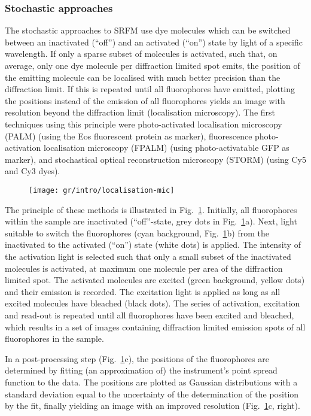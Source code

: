\subsubsection{Stochastic approaches}
\label{sec:smlm}
The stochastic approaches to SRFM use dye molecules which can be switched
between an inactivated (``off'') and an activated (``on'') state by light of a
specific wavelength. If only a sparse subset of molecules is activated, such
that, on average, only one dye molecule per diffraction limited spot emits,
the position of the emitting molecule can be localised with much better
precision than the diffraction limit. If this is repeated until all
fluorophores have emitted, plotting the positions instead of the emission of
all fluorophores yields an image with resolution beyond the diffraction
limit (localisation microscopy). The first techniques using this principle
were photo-activated localisation microscopy (PALM) \cite{Betzig2006} (using
the Eos fluorescent protein \cite{Wiedenmann2004} as marker), fluorescence
photo-activation localisation microscopy (FPALM) \cite{Hess2006} (using
photo-activatable GFP as marker), and stochastical
optical reconstruction microscopy (STORM) \cite{Rust2006} (using Cy5 and Cy3
dyes).

\begin{figure}
  \centering
  \texttt{[image: gr/intro/localisation-mic]}
  \caption{}
  \label{fig:lm}
\end{figure}

The principle of these methods is illustrated in Fig.~\ref{fig:lm}. Initially,
all fluorophores within the sample are inactivated (``off''-state, grey dots
in Fig.~\ref{fig:lm}a). Next, light suitable to switch the fluorophores (cyan
background, Fig.~\ref{fig:lm}b) from the inactivated to the activated (``on'')
state (white dots) is applied. The intensity of the activation light is
selected such that only a small subset of the inactivated molecules is
activated, at maximum one molecule per area of the diffraction limited
spot. The activated molecules are excited (green background, yellow dots) and
their emission is recorded. The excitation light is applied as long as all
excited molecules have bleached (black dots). The series of activation,
excitation and read-out is repeated until all fluorophores have been excited
and bleached, which results in a set of images containing diffraction limited
emission spots of all fluorophores in the sample.

In a post-processing step (Fig.~\ref{fig:lm}c), the positions of the
fluorophores are determined by fitting (an approximation of) the instrument's
point spread function to the data. The positions are plotted as Gaussian
distributions with a standard deviation equal to the uncertainty of the
determination of the position by the fit, finally yielding an image with an
improved resolution (Fig.~\ref{fig:lm}c, right).

